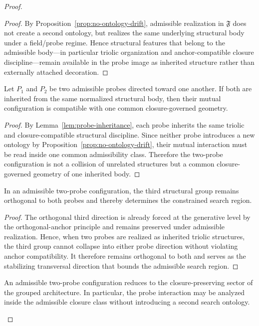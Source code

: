 \begin{proof}
\begin{proof}
By Proposition~\ref{prop:no-ontology-drift}, admissible realization in
$\mathfrak F$ does not create a second ontology, but realizes the same
underlying structural body under a field/probe regime. Hence structural features
that belong to the admissible body---in particular triolic organization and
anchor-compatible closure discipline---remain available in the probe image as
inherited structure rather than externally attached decoration.
\end{proof}

\begin{lemma}
\label{lem:two-probe-compatibility}
Let $P_1$ and $P_2$ be two admissible probes directed toward one another. If
both are inherited from the same normalized structural body, then their mutual
configuration is compatible with one common closure-governed geometry.
\end{lemma}

\begin{proof}
By Lemma~\ref{lem:probe-inheritance}, each probe inherits the same triolic and
closure-compatible structural discipline. Since neither probe introduces a new
ontology by Proposition~\ref{prop:no-ontology-drift}, their mutual interaction
must be read inside one common admissibility class. Therefore the two-probe
configuration is not a collision of unrelated structures but a common
closure-governed geometry of one inherited body.
\end{proof}

\begin{lemma}
\label{lem:orthogonal-third-group-probe}
In an admissible two-probe configuration, the third structural group remains
orthogonal to both probes and thereby determines the constrained search region.
\end{lemma}

\begin{proof}
The orthogonal third direction is already forced at the generative level by the
orthogonal-anchor principle and remains preserved under admissible realization.
Hence, when two probes are realized as inherited triolic structures, the third
group cannot collapse into either probe direction without violating anchor
compatibility. It therefore remains orthogonal to both and serves as the
stabilizing transversal direction that bounds the admissible search region.
\end{proof}

\begin{proposition}
\label{prop:probe-reduction-theorem}
An admissible two-probe configuration reduces to the closure-preserving sector of
the grouped architecture. In particular, the probe interaction may be analyzed
inside the admissible closure class without introducing a second search
ontology.
\end{proposition}


\end{proof}
